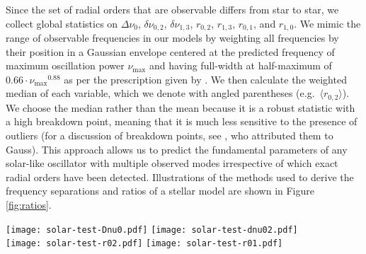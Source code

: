 \documentclass[manuscript,linenumbers]{aastex6}
\begin{document}
Since the set of radial orders that are observable differs from star to star, we collect global statistics on $\Delta\nu_0$, $\delta\nu_{0,2}$, $\delta\nu_{1,3}$, $r_{0,2}$, $r_{1,3}$, $r_{0,1}$, and $r_{1,0}$. We mimic the range of observable frequencies in our models by weighting all frequencies by their position in a Gaussian envelope centered at the predicted frequency of maximum oscillation power $\nu_{\max}$ and having full-width at half-maximum of $0.66\cdot\nu_{\max}{}^{0.88}$ as per the prescription given by \citet{2012AA...537A..30M}. We then calculate the weighted median of each variable, which we denote with angled parentheses (e.g.\ $\langle r_{0,2}\rangle$). We choose the median rather than the mean because it is a robust statistic with a high breakdown point, meaning that it is much less sensitive to the presence of outliers (for a discussion of breakdown points, see \citealt{hampel1971general}, who attributed them to Gauss). This approach allows us to predict the fundamental parameters of any solar-like oscillator with multiple observed modes irrespective of which exact radial orders have been detected. Illustrations of the methods used to derive the frequency separations and ratios of a stellar model are shown in Figure \ref{fig:ratios}. 

\begin{figure*}
    \centering
    \texttt{[image: solar-test-Dnu0.pdf]}\hfill
    \texttt{[image: solar-test-dnu02.pdf]}\\
    \texttt{[image: solar-test-r02.pdf]}\hfill
    \texttt{[image: solar-test-r01.pdf]}\\
    \caption{Calculation of seismic parameters for a stellar model. %
    The large and small frequency separations $\Delta\nu_0$ (top left) and $\delta\nu_{0,2}$ (top right) and frequency ratios $r_{0,2}$ (bottom left) and $r_{0,1}$ (bottom right) are shown as a function of frequency. The vertical dotted line in these bottom four plots indicates $\nu_{\max}$, and a $\nu_{\max}$-weighted linear fit is shown with a dashed diagonal line to guide the eye. Points are sized and colored proportionally to the applied weighting. }%
    \label{fig:ratios}
\end{figure*}
\end{document}
